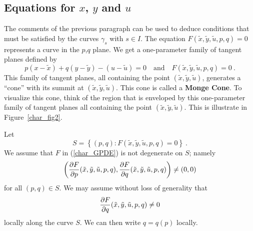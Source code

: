 \subsection{Equations for $x$, $y$ and $u$}

The comments of the previous paragraph can be used to deduce
conditions that must be satisfied by the curves $\gamma_s$ with
$s\in I$.  The equation $F(\tilde{x},\tilde{y},\tilde{u},p,q)=0$
represents a curve in the $p$,$q$ plane.  We get a one-parameter
family of tangent planes defined by
\[
p(x-\tilde{x}) + q (y-\tilde{y}) - (u-\tilde{u}) = 0 \quad \text{and}
\quad F(\tilde{x},\tilde{y},\tilde{u},p,q)=0 \ .
\]
This family of tangent planes, all containing the point
$(\tilde{x},\tilde{y},\tilde{u})$,
generates a ``cone'' with its summit at
$(\tilde{x},\tilde{y},\tilde{u})$.  This cone
is called a {\bfseries Monge Cone}.
To visualize this cone, think of the region that is enveloped by this
one-parameter family of tangent planes all containing the point
$(\tilde{x},\tilde{y},\tilde{u})$. This is illustrate in Figure~\ref{char_fig2}.


Let
\[
S = \left\{ (p,q) : F(\tilde{x},\tilde{y},\tilde{u},p,q) = 0 \right\} \ .
\]
We assume that $F$ in (\ref{char_GPDE}) is not degenerate on $S$;
namely
\[
\left(\frac{\partial{F}}{\partial p}(\tilde{x},\tilde{y},\tilde{u},p,q),
\frac{\partial{F}}{\partial q}(\tilde{x},\tilde{y},\tilde{u},p,q) \right) \neq (0,0)
\]
for all $(p,q) \in S$.  We may assume without loss of generality that
\[
\frac{\partial{F}}{\partial q}(\tilde{x},\tilde{y},\tilde{u},p,q) \neq 0
\]
locally along the curve $S$.  We can then write $q=q(p)$ locally.

